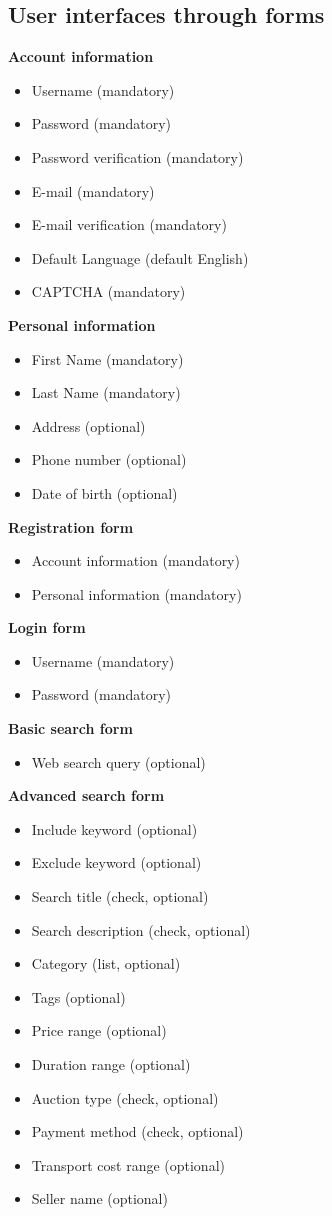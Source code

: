 	\subsection{User interfaces through forms}
	\textbf{Account information}
		\begin{itemize}
			\item Username (mandatory)
			\item Password (mandatory)
			\item Password verification (mandatory)
			\item E-mail (mandatory)
			\item E-mail verification (mandatory)
			\item Default Language (default English)
			\item CAPTCHA (mandatory)
		\end{itemize}
	\textbf{Personal information}
		\begin{itemize}
			\item First Name (mandatory)
			\item Last Name (mandatory)
			\item Address (optional)
			\item Phone number (optional)
			\item Date of birth (optional)
		\end{itemize}
	\textbf{Registration form}
		\begin{itemize}
			\item Account information (mandatory)
			\item Personal information (mandatory)
		\end{itemize}
	\textbf{Login form}
		\begin{itemize}
			\item Username (mandatory)
			\item Password (mandatory)
		\end{itemize}
	\textbf{Basic search form}
		\begin{itemize}
			\item Web search query (optional)
		\end{itemize}
	\textbf{Advanced search form}
		\begin{itemize}
			\item Include keyword (optional)
			\item Exclude keyword (optional)
			\item Search title (check, optional)
			\item Search description (check, optional)
			\item Category (list, optional)
			\item Tags (optional)
			\item Price range (optional)
			\item Duration range (optional)
			\item Auction type (check, optional)
			\item Payment method (check, optional)
			\item Transport cost range (optional)
			\item Seller name (optional)
		\end{itemize}
